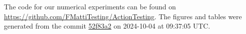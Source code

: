 The code for our numerical experiments can be found on \url{https://github.com/FMattiTesting/ActionTesting}. The figures and tables were generated from the commit \href{https://github.com/FMattiTesting/ActionTesting/tree/52f83a2}{52f83a2} on 2024-10-04 at 09:37:05 UTC.
